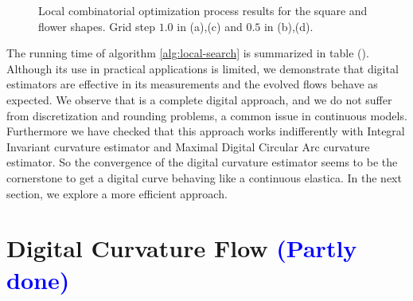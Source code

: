 \documentclass[runningheads]{llncs}
\newcommand{\todo}[1]{{\textcolor{blue}{#1}}}
\newcommand{\jaco}[1]{{\textcolor{green!50!black}{#1}}}
\begin{document}
\begin{figure}[!ht]
\begin{minipage}[b]{0.45\textwidth}
{	}%
	\hspace{10pt}
\end{minipage}		
		\caption{Local combinatorial optimization process results for the square and flower shapes. Grid step $1.0$ in (a),(c) and $0.5$ in (b),(d).}	
		\label{fig:local-comb-square-results}
\end{figure}


The running time of algorithm \ref{alg:local-search} is summarized in
table (). Although its use in practical applications is limited, we
demonstrate that digital estimators are effective in its measurements
and the evolved flows behave as expected. We observe that is a
complete digital approach, and we do not suffer from discretization
and rounding problems, a common issue in continuous models.
\jaco{Furthermore we have checked that this approach works
  indifferently with Integral Invariant curvature estimator and
  Maximal Digital Circular Arc curvature estimator. So the convergence
  of the digital curvature estimator seems to be the cornerstone to
  get a digital curve behaving like a continuous elastica.}  In the
next section, we explore a more efficient approach.

\section{Digital Curvature Flow \todo{(Partly done)}}
\end{document}
